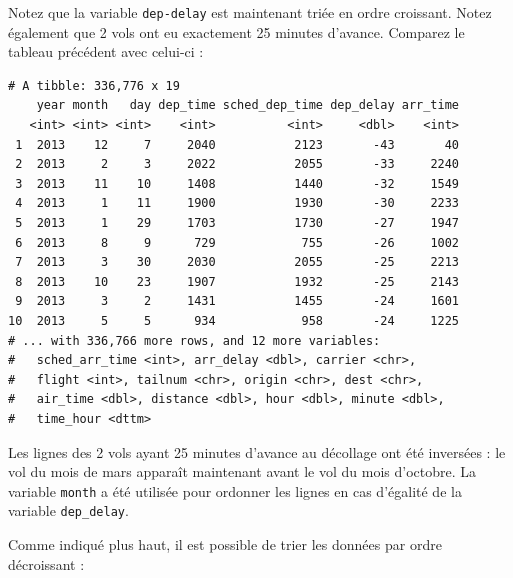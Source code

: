 \documentclass[
  a4paper,
]{article}
\newenvironment{Shaded}{\begin{snugshade}}{\end{snugshade}}
\newcommand{\KeywordTok}[1]{\textcolor[rgb]{0.12,0.11,0.11}{\textbf{#1}}}
\newcommand{\NormalTok}[1]{\textcolor[rgb]{0.12,0.11,0.11}{#1}}
\newcommand{\OperatorTok}[1]{\textcolor[rgb]{0.12,0.11,0.11}{#1}}
\newcommand{\StringTok}[1]{\textcolor[rgb]{0.75,0.01,0.01}{#1}}
\begin{document}
Notez que la variable \texttt{dep-delay} est maintenant triée en ordre croissant. Notez également que 2 vols ont eu exactement 25 minutes d'avance. Comparez le tableau précédent avec celui-ci :

\begin{Shaded}
\end{Shaded}

\begin{verbatim}
# A tibble: 336,776 x 19
    year month   day dep_time sched_dep_time dep_delay arr_time
   <int> <int> <int>    <int>          <int>     <dbl>    <int>
 1  2013    12     7     2040           2123       -43       40
 2  2013     2     3     2022           2055       -33     2240
 3  2013    11    10     1408           1440       -32     1549
 4  2013     1    11     1900           1930       -30     2233
 5  2013     1    29     1703           1730       -27     1947
 6  2013     8     9      729            755       -26     1002
 7  2013     3    30     2030           2055       -25     2213
 8  2013    10    23     1907           1932       -25     2143
 9  2013     3     2     1431           1455       -24     1601
10  2013     5     5      934            958       -24     1225
# ... with 336,766 more rows, and 12 more variables:
#   sched_arr_time <int>, arr_delay <dbl>, carrier <chr>,
#   flight <int>, tailnum <chr>, origin <chr>, dest <chr>,
#   air_time <dbl>, distance <dbl>, hour <dbl>, minute <dbl>,
#   time_hour <dttm>
\end{verbatim}

Les lignes des 2 vols ayant 25 minutes d'avance au décollage ont été inversées : le vol du mois de mars apparaît maintenant avant le vol du mois d'octobre. La variable \texttt{month} a été utilisée pour ordonner les lignes en cas d'égalité de la variable \texttt{dep\_delay}.

Comme indiqué plus haut, il est possible de trier les données par ordre décroissant :

\begin{Shaded}
\end{Shaded}
\end{document}
